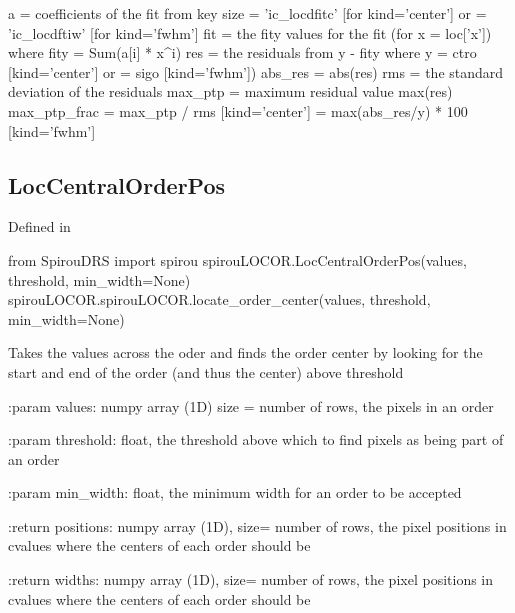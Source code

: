 \begin{minipage}{\textwidth}
\begin{pythondocstring}
        a = coefficients of the fit from key
        size = 'ic_locdfitc' [for kind='center'] or
             = 'ic_locdftiw' [for kind='fwhm']
        fit = the fity values for the fit (for x = loc['x'])
            where fity = Sum(a[i] * x^i)
        res = the residuals from y - fity
             where y = ctro [kind='center'] or 
                     = sigo [kind='fwhm'])
        abs_res = abs(res)
        rms = the standard deviation of the residuals
        max_ptp = maximum residual value max(res)
        max_ptp_frac = max_ptp / rms  [kind='center']
                     = max(abs_res/y) * 100   [kind='fwhm']
\end{pythondocstring}
\end{minipage}

\begin{minipage}{\textwidth}
\subsection{LocCentralOrderPos}

Defined in \spirouLOCOR{}

\begin{pythonbox}
from SpirouDRS import spirou
spirouLOCOR.LocCentralOrderPos(values, threshold, min_width=None)
spirouLOCOR.spirouLOCOR.locate_order_center(values, threshold, min_width=None)
\end{pythonbox}

\begin{pythondocstring}
Takes the values across the oder and finds the order center by looking for
the start and end of the order (and thus the center) above threshold

:param values: numpy array (1D) size = number of rows, the pixels in an
                order

:param threshold: float, the threshold above which to find pixels as being
                  part of an order

:param min_width: float, the minimum width for an order to be accepted

:return positions: numpy array (1D), size= number of rows,
                   the pixel positions in cvalues where the centers of each
                   order should be

:return widths:    numpy array (1D), size= number of rows,
                   the pixel positions in cvalues where the centers of each
                   order should be
\end{pythondocstring}
\end{minipage}

